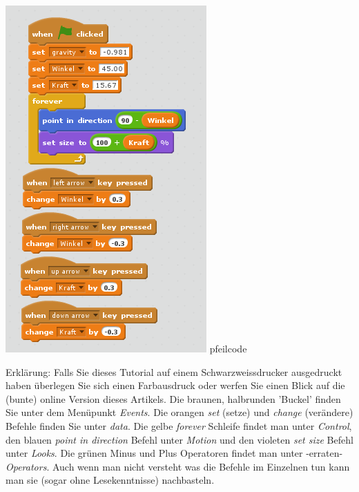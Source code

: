 \begin{center}
\includegraphics[width=\linewidth]{scratch/fpfeilcode.png}
\footnotesize{pfeilcode}
\end{center}

Erklärung: Falls Sie dieses Tutorial auf einem Schwarzweissdrucker ausgedruckt haben überlegen Sie sich einen Farbausdruck oder werfen Sie einen Blick auf die (bunte) online Version dieses Artikels. Die braunen, halbrunden 'Buckel' finden Sie unter dem Menüpunkt \textit{Events}. Die orangen \textit{set} (setze) und \textit{change} (verändere) Befehle finden Sie unter \textit{data}. Die gelbe \textit{forever} Schleife findet man unter \textit{Control}, den blauen \textit{point in direction} Befehl unter \textit{Motion} und den violeten \textit{set size} Befehl unter \textit{Looks}. Die grünen Minus und Plus Operatoren findet man unter -erraten- \textit{Operators}. Auch wenn man nicht versteht was die Befehle im Einzelnen tun kann man sie (sogar ohne Lesekenntnisse) nachbasteln. 

